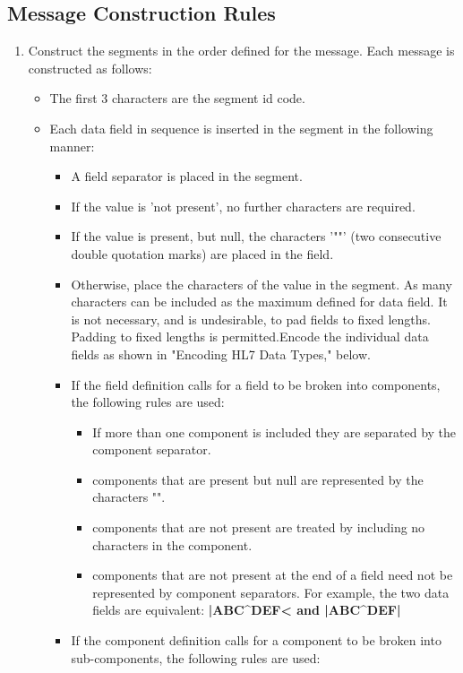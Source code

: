 \documentclass[a4paper,12pt]{article}
\begin{document}
\subsection{Message Construction Rules}
\begin{enumerate}
    \item  Construct the segments in the order defined for the message. Each message is constructed as follows:
    \begin{itemize}
        \item The first 3 characters are the segment id code.
        \item Each data field in sequence is inserted in the segment in the following manner:
        \begin{itemize}
            \item A field separator is placed in the segment.
            \item If the value is 'not present', no further characters are required.
            \item If the value is present, but null, the characters '""' (two consecutive double quotation marks) are placed in the field.
            \item Otherwise, place the characters of the value in the segment. As many characters can be included as the maximum defined for data field. It is not necessary, and is undesirable, to pad fields to fixed lengths. Padding to fixed lengths is permitted.Encode the individual data fields as shown in "Encoding HL7 Data Types," below.
            \item If the field definition calls for a field to be broken into components, the following rules are used:
            \begin{itemize}
                \item If more than one component is included they are separated by the component separator.
                \item components that are present but null are represented by the characters "".
                \item components that are not present are treated by including no characters in the component.
                \item components that are not present at the end of a field need not be represented by component separators. For example, the two data fields are equivalent: \textbf{|ABC^DEF^^| and |ABC^DEF|}
            \end{itemize}
            \item If the component definition calls for a component to be broken into sub-components, the following rules are used:

\end{itemize}
\end{itemize}
\end{enumerate}
\end{document}
